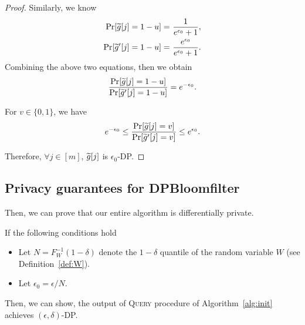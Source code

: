 \begin{proof}
Similarly, we know 
\begin{align*}
    \Pr [ \widetilde{g}[j] = 1-u ] = & ~ \frac{ 1 }{ e^{\epsilon_0} + 1 }, \\
    \Pr[ \widetilde{g}'[j] = 1-u ] = & ~ \frac{ e^{\epsilon_0} }{ e^{\epsilon_0} + 1 }.
\end{align*}
Combining the above two equations, then we obtain
\begin{align*}
\frac{ \Pr [ \widetilde{g}[j] = 1- u ] }{ \Pr[ \widetilde{g}'[j] = 1-u ] } = e^{-\epsilon_0}.
\end{align*}


For $v \in \{0, 1\}$, we have 
\begin{align*}
e^{- \epsilon_0} \leq \frac{ \Pr [ \widetilde{g}[j] = v ] }{ \Pr [ \widetilde{g}'[j] = v ] } \leq e^{\epsilon_0}.
\end{align*}



Therefore, $\forall j \in [m]$, $\widetilde{g}[j]$ is $\epsilon_0$-DP. 
\end{proof}

\subsection{Privacy guarantees for DPBloomfilter}\label{sec:query_privacy}
Then, we can prove that our entire algorithm is differentially private.
\begin{theorem}\label{thm:query_privacy:formal}
If the following conditions hold
\begin{itemize}
    \item Let $N = F_W^{-1}(1 - \delta)$ denote the $1 - \delta$ quantile of the random variable $W$ (see Definition~\ref{def:W}).
    \item Let  $\epsilon_0 = \epsilon / N$.
\end{itemize}

Then, we can show,
the output of \textsc{Query} procedure of Algorithm~\ref{alg:init} achieves $(\epsilon, \delta)$-DP. 
\end{theorem}


